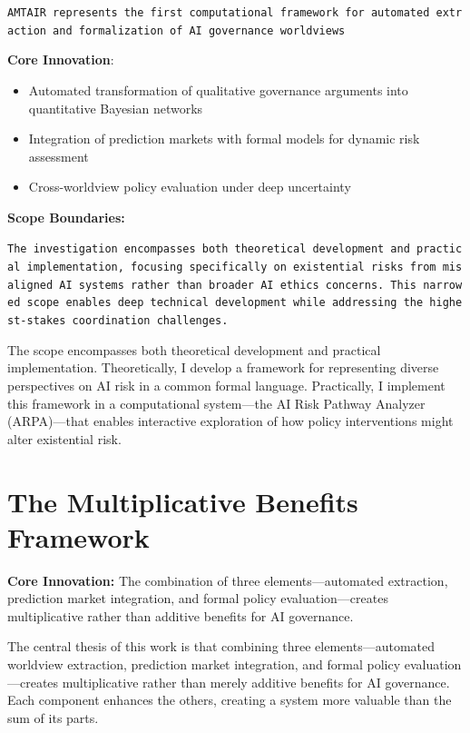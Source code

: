 \documentclass[
  11pt,
  letterpaper,
]{book}
\providecommand{\tightlist}{%
  \setlength{\itemsep}{0pt}\setlength{\parskip}{0pt}}
\begin{document}
\texttt{AMTAIR\ represents\ the\ first\ computational\ framework\ for\ automated\ extraction\ and\ formalization\ of\ AI\ governance\ worldviews}

\textbf{Core Innovation}:

\begin{itemize}
\tightlist
\item
  Automated transformation of qualitative governance arguments into
  quantitative Bayesian networks
\item
  Integration of prediction markets with formal models for dynamic risk
  assessment
\item
  Cross-worldview policy evaluation under deep uncertainty
\end{itemize}

\textbf{Scope Boundaries:}

\texttt{The\ investigation\ encompasses\ both\ theoretical\ development\ and\ practical\ implementation,\ focusing\ specifically\ on\ existential\ risks\ from\ misaligned\ AI\ systems\ rather\ than\ broader\ AI\ ethics\ concerns.\ This\ narrowed\ scope\ enables\ deep\ technical\ development\ while\ addressing\ the\ highest-stakes\ coordination\ challenges.}

The scope encompasses both theoretical development and practical
implementation. Theoretically, I develop a framework for representing
diverse perspectives on AI risk in a common formal language.
Practically, I implement this framework in a computational system---the
AI Risk Pathway Analyzer (ARPA)---that enables interactive exploration
of how policy interventions might alter existential risk.

\section{The Multiplicative Benefits
Framework}\label{sec-multiplicative-benefits}

\textbf{Core Innovation:} The combination of three elements---automated
extraction, prediction market integration, and formal policy
evaluation---creates multiplicative rather than additive benefits for AI
governance.

The central thesis of this work is that combining three
elements---automated worldview extraction, prediction market
integration, and formal policy evaluation---creates multiplicative
rather than merely additive benefits for AI governance. Each component
enhances the others, creating a system more valuable than the sum of its
parts.
\end{document}
